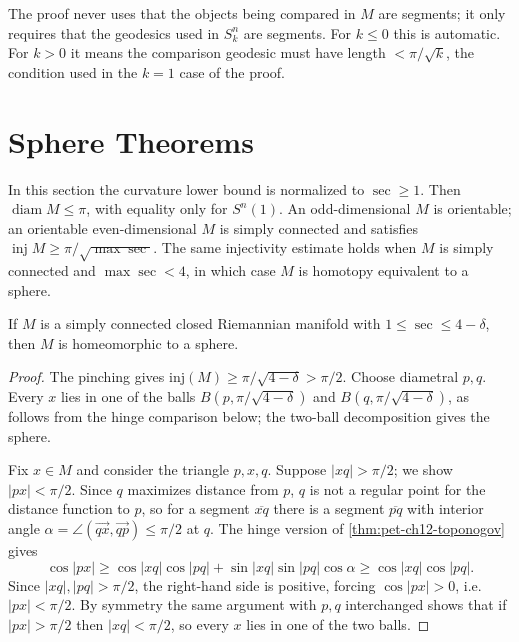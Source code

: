 \begin{remark}
  \label{rem:pet-ch12-toponogov-segment-remark}

  The proof never uses that the objects being compared in $M$ are segments; it
  only requires that the geodesics used in $S_k^n$ are segments. For $k\le0$
  this is automatic. For $k>0$ it means the comparison geodesic must have length
  $<\pi/\sqrt k$, the condition used in the $k=1$ case of the proof.
\end{remark}

\section{Sphere Theorems}

In this section the curvature lower bound is normalized to $\sec\ge1$. Then
$\operatorname{diam}M\le\pi$, with equality only for $S^n(1)$. An odd-dimensional
$M$ is orientable; an orientable even-dimensional $M$ is simply connected and
satisfies $\operatorname{inj}M\ge\pi/\sqrt{\max\sec}$. The same injectivity
estimate holds when $M$ is simply connected and $\max\sec<4$, in which case
$M$ is homotopy equivalent to a sphere.

\begin{theorem}
  \label{thm:pet-ch12-quarter-pinched-sphere}

  If $M$ is a simply connected closed Riemannian manifold with
  $1\le\sec\le4-\delta$, then $M$ is homeomorphic to a sphere.
\end{theorem}
\begin{proof}
  \sketch
  The pinching gives $\mathrm{inj}(M)\ge\pi/\sqrt{4-\delta}>\pi/2$. Choose
  diametral $p,q$. Every $x$ lies in one of the balls
  $B(p,\pi/\sqrt{4-\delta})$ and $B(q,\pi/\sqrt{4-\delta})$, as follows from
  the hinge comparison below; the two-ball decomposition gives the sphere.

  Fix $x\in M$ and consider the triangle $p,x,q$. Suppose $|xq|>\pi/2$; we show
  $|px|<\pi/2$. Since $q$ maximizes distance from $p$, $q$ is not a regular
  point for the distance function to $p$, so for a segment $\overline{xq}$
  there is a segment $\overline{pq}$ with interior angle
  $\alpha=\angle(\overrightarrow{qx},\overrightarrow{qp})\le\pi/2$ at $q$. The
  hinge version of \cref{thm:pet-ch12-toponogov} gives
  \[
    \cos|px|\ge\cos|xq|\cos|pq|+\sin|xq|\sin|pq|\cos\alpha\ge\cos|xq|\cos|pq|.
  \]
  Since $|xq|,|pq|>\pi/2$, the right-hand side is positive, forcing
  $\cos|px|>0$, i.e.\ $|px|<\pi/2$. By symmetry the same argument with $p,q$
  interchanged shows that if $|px|>\pi/2$ then $|xq|<\pi/2$, so every $x$ lies
  in one of the two balls.
\end{proof}

